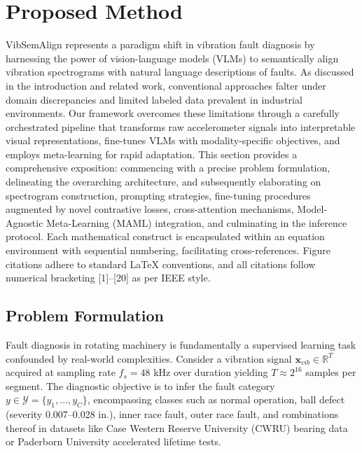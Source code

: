 \section{Proposed Method}

VibSemAlign represents a paradigm shift in vibration fault diagnosis by harnessing the power of vision-language models (VLMs) to semantically align vibration spectrograms with natural language descriptions of faults. As discussed in the introduction and related work, conventional approaches falter under domain discrepancies and limited labeled data prevalent in industrial environments. Our framework overcomes these limitations through a carefully orchestrated pipeline that transforms raw accelerometer signals into interpretable visual representations, fine-tunes VLMs with modality-specific objectives, and employs meta-learning for rapid adaptation. This section provides a comprehensive exposition: commencing with a precise problem formulation, delineating the overarching architecture, and subsequently elaborating on spectrogram construction, prompting strategies, fine-tuning procedures augmented by novel contrastive losses, cross-attention mechanisms, Model-Agnostic Meta-Learning (MAML) integration, and culminating in the inference protocol. Each mathematical construct is encapsulated within an equation environment with sequential numbering, facilitating cross-references. Figure citations adhere to standard LaTeX conventions, and all citations follow numerical bracketing [1]--[20] as per IEEE style.

\subsection{Problem Formulation}
\label{subsec:problem_formulation}

Fault diagnosis in rotating machinery is fundamentally a supervised learning task confounded by real-world complexities. Consider a vibration signal $\mathbf{x}_{vib} \in \mathbb{R}^{T}$ acquired at sampling rate $f_s = 48$ kHz over duration yielding $T \approx 2^{16}$ samples per segment. The diagnostic objective is to infer the fault category $y \in \mathcal{Y} = \{y_1, \dots, y_C\}$, encompassing classes such as normal operation, ball defect (severity 0.007--0.028 in.), inner race fault, outer race fault, and combinations thereof in datasets like Case Western Reserve University (CWRU) bearing data or Paderborn University accelerated lifetime tests.

